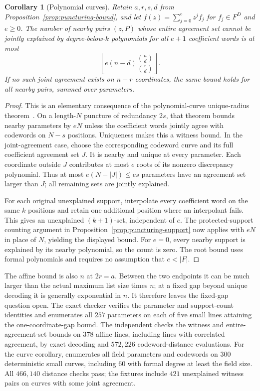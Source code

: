 \documentclass[11pt,letterpaper]{article}
\newtheorem{corollary}[theorem]{Corollary}
\theoremstyle{definition}
\theoremstyle{remark}
\begin{document}
\begin{corollary}[Polynomial curves]
\label{cor:puncturing-curves}
Retain $a,r,s,d$ from Proposition~\ref{prop:puncturing-bound}, and let
$f(z)=\sum_{j=0}^{e}z^j f_j$ for $f_j\in F^D$ and $e\ge0$.
The number of nearby pairs $(z,P)$ whose entire agreement set cannot
be jointly explained by degree-below-$k$ polynomials for all $e+1$
coefficient words is at most
\[
 \left\lfloor e(n-d)\frac{\binom nd}{\binom rd}\right\rfloor.
\]
If no such joint agreement exists on $n-r$ coordinates, the same
bound holds for all nearby pairs, summed over parameters.
\end{corollary}
\begin{proof}
This is an elementary consequence of the polynomial-curve
unique-radius theorem~\cite[Theorem~6.1]{bciks}.
On a length-$N$ puncture of redundancy $2s$, that theorem bounds
nearby parameters by $eN$ unless the coefficient words jointly agree
with codewords on $N-s$ positions. Uniqueness makes this a witness
bound. In the joint-agreement case, choose the corresponding codeword
curve and its full coefficient agreement set $J$. It is nearby and
unique at every parameter. Each coordinate outside $J$ contributes
at most $e$ roots of its nonzero discrepancy polynomial. Thus at
most $e(N-|J|)\le es$ parameters have an agreement set larger than
$J$; all remaining sets are jointly explained.

For each original unexplained support, interpolate every coefficient
word on the same $k$ positions and retain one additional position
where an interpolant fails. This gives an unexplained $(k+1)$-set,
independent of $e$. The protected-support counting argument in
Proposition~\ref{prop:puncturing-support} now applies with $eN$
in place of $N$, yielding the displayed bound. For $e=0$, every
nearby support is explained by its nearby polynomial, so the count
is zero. The root bound uses formal polynomials and requires no
assumption that $e<|F|$.
\end{proof}

The affine bound is also $n$ at $2r=a$. Between the two endpoints it can
be much larger than the actual maximum list size times $n$; at a
fixed gap beyond unique decoding it is generally exponential in $n$.
It therefore leaves the fixed-gap question open. The exact checker
 verifies the parameter and
support-count identities and enumerates all $257$ parameters on each
of five small lines attaining the one-coordinate-gap bound. The
independent 
checks the witness and entire-agreement-set bounds on $378$ affine
lines, including lines with correlated agreement, by exact decoding
and $572{,}226$ codeword-distance evaluations.
For the curve corollary, 
enumerates all field parameters and codewords on $300$ deterministic
small curves, including $60$ with formal degree at least the field
size. All $466{,}140$ distance checks pass; the fixtures include
$421$ unexplained witness pairs on curves with some joint agreement.
\end{document}
